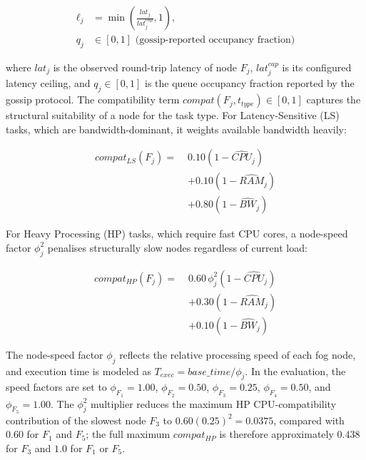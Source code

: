 \documentclass[conference]{IEEEtran}
\begin{document}
    \begin{equation}
    \begin{aligned}
    \ell_j &= \min\!\left(\frac{lat_j}{lat_j^{cap}},1\right),\\
    q_j &\in [0,1] \text{ (gossip-reported occupancy fraction)}
    \end{aligned}
    \label{eq:e5-normalized-latency-queue}
    \end{equation}

    where $lat_j$ is the observed round-trip latency of node $F_j$, $lat_j^{cap}$ is its configured latency ceiling, and $q_j \in [0,1]$ is the queue occupancy fraction reported by the gossip protocol. The compatibility term $compat(F_j,t_{type})\in[0,1]$ captures the structural suitability of a node for the task type. For Latency-Sensitive (LS) tasks, which are bandwidth-dominant, it weights available bandwidth heavily:

    \begin{equation}
    \begin{aligned}
    compat_{LS}(F_j) =\;& 0.10(1-\widehat{CPU}_j) \\
    &+ 0.10(1-\widehat{RAM}_j) \\
    &+ 0.80(1-\widehat{BW}_j)
    \end{aligned}
    \end{equation}

    For Heavy Processing (HP) tasks, which require fast CPU cores, a node-speed factor $\phi_j^2$ penalises structurally slow nodes regardless of current load:

    \begin{equation}
    \begin{aligned}
    compat_{HP}(F_j) =\;& 0.60\,\phi_j^2(1-\widehat{CPU}_j)\\
    &+ 0.30(1-\widehat{RAM}_j) \\
    &+ 0.10(1-\widehat{BW}_j)
    \end{aligned}
    \end{equation}

    The node-speed factor $\phi_j$ reflects the relative processing speed of each fog node, and execution time is modeled as $T_{exec}=base\_time/\phi_j$. In the evaluation, the speed factors are set to $\phi_{F_1}=1.00$, $\phi_{F_2}=0.50$, $\phi_{F_3}=0.25$, $\phi_{F_4}=0.50$, and $\phi_{F_5}=1.00$. The $\phi_j^2$ multiplier reduces the maximum HP CPU-compatibility contribution of the slowest node $F_3$ to $0.60(0.25)^2=0.0375$, compared with $0.60$ for $F_1$ and $F_5$; the full maximum $compat_{HP}$ is therefore approximately $0.438$ for $F_3$ and $1.0$ for $F_1$ or $F_5$.
\end{document}
